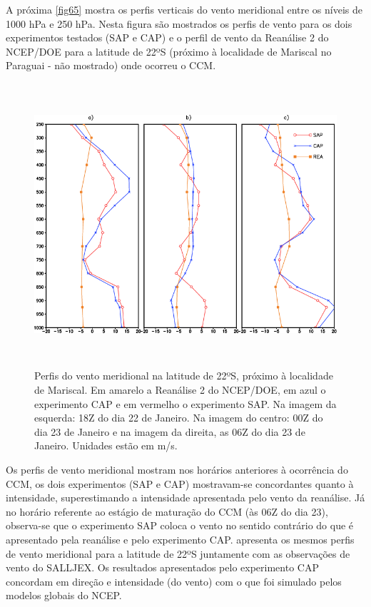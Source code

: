 A próxima \autoref{fig65} mostra os perfis verticais do vento meridional entre os níveis de 1000 hPa e 250 hPa. Nesta figura são mostrados os perfis de vento para os dois experimentos testados (SAP e CAP) e o perfil de vento da Reanálise 2 do NCEP/DOE para a latitude de 22ºS (próximo à localidade de Mariscal no Paraguai - não mostrado) onde ocorreu o CCM. 

\begin{figure}[!hpb]
\centering
\includegraphics[height=10.5cm]{./figs/perf_vert_vento.png}
\caption{Perfis do vento meridional na latitude de 22ºS, próximo à localidade de Mariscal. Em amarelo a Reanálise 2 do NCEP/DOE, em azul o experimento CAP e em vermelho o experimento SAP. Na imagem da esquerda: 18Z do dia 22 de Janeiro. Na imagem do centro: 00Z do dia 23 de Janeiro e na imagem da direita, as 06Z do dia 23 de Janeiro. Unidades estão em m/s.}
\label{fig65}
\end{figure}

Os perfis de vento meridional mostram nos horários anteriores à ocorrência do CCM, os dois experimentos (SAP e CAP) mostravam-se concordantes quanto à intensidade, superestimando a intensidade apresentada pelo vento da reanálise. Já no horário referente ao estágio de maturação do CCM (às 06Z do dia 23), observa-se que o experimento SAP coloca o vento no sentido contrário do que é apresentado pela reanálise e pelo experimento CAP.  apresenta os mesmos perfis de vento meridional para a latitude de 22ºS juntamente com as observações de vento do SALLJEX. Os resultados apresentados pelo experimento CAP concordam em direção e intensidade (do vento) com o que foi simulado pelos modelos globais do NCEP.

